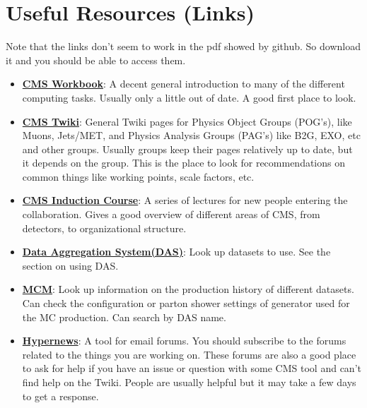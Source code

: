 \section{Useful Resources (Links)}

Note that the links don't seem to work in the pdf showed by github. So download it and you should be able to access them.

\begin{itemize}
  \item \textbf{\href{https://twiki.cern.ch/twiki/bin/view/CMSPublic/WorkBook}{CMS Workbook}}:
    A decent general introduction to many of the different computing tasks. Usually only a little out of date. A good first place to look. 

  \item \textbf{\href{https://twiki.cern.ch/twiki/bin/view/CMS/WebHome}{CMS Twiki}}:
    General Twiki pages for Physics Object Groups (POG's), like Muons, Jets/MET, and Physics Analysis Groups (PAG's) like B2G, EXO, etc and other groups. 
    Usually groups keep their pages relatively up to date, but it depends on the group. This is the place to look for recommendations on common things like working points, scale factors, etc. 

  \item \textbf{\href{https://indico.cern.ch/event/639530/timetable/}{CMS Induction Course}}:
    A series of lectures for new people entering the collaboration. Gives a good overview of different areas of CMS, from detectors, to organizational structure.

  \item \textbf{\href{https://cmsweb.cern.ch/das/}{Data Aggregation System(DAS)}}:
    Look up datasets to use. See the section on using DAS.

  \item \textbf{\href{https://cms-pdmv.cern.ch/mcm/requests?page=0&shown=127}{MCM}}:
    Look up information on the production history of different datasets. Can check the configuration or parton shower settings of generator used for the MC production.
    Can search by DAS name. 

  \item \textbf{\href{https://hypernews.cern.ch/HyperNews/CMS/cindex}{Hypernews}}:
    A tool for email forums. You should subscribe to the forums related to the things you are working on. These forums are also a good place to ask for help if you have an issue or question 
    with some CMS tool and can't find help on the Twiki. People are usually helpful but it may take a few days to get a response. 


\end{itemize}
